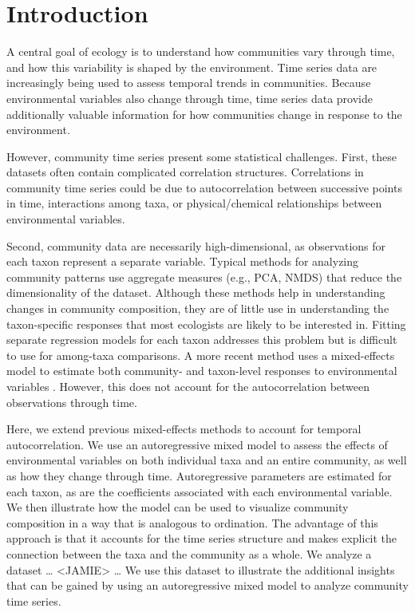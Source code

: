 

\section*{Introduction}


A central goal of ecology is to understand how communities vary through time, and
how this variability is shaped by the environment.
Time series data are increasingly being used to assess temporal trends in communities.
Because environmental variables also change through time, time series data provide
additionally valuable information for how communities change in response to the
environment.


However, community time series present some statistical challenges.
First, these datasets often contain complicated correlation structures.
Correlations in community time series could be due to
autocorrelation between successive points in time,
interactions among taxa,
or physical/chemical relationships between environmental variables.


Second, community data are necessarily high-dimensional, as observations for each taxon
represent a separate variable.
Typical methods for analyzing community patterns use aggregate measures (e.g., PCA, NMDS)
that reduce the dimensionality of the dataset.
Although these methods help in understanding changes in community composition,
they are of little use in understanding the taxon-specific responses
that most ecologists are likely to be interested in.
Fitting separate regression models for each taxon addresses this problem but
is difficult to use for among-taxa comparisons.
A more recent method uses a mixed-effects model to estimate both
community- and taxon-level responses to environmental variables \citep{Jackson2012}.
However, this does not account for the autocorrelation between observations through time.


Here, we extend previous mixed-effects methods to account for temporal autocorrelation.
We use an autoregressive mixed model to assess the effects of environmental variables
on both individual taxa and an entire community, as well as how they change through time.
Autoregressive parameters are estimated for each taxon, as are the coefficients
associated with each environmental variable.
We then illustrate how the model can be used to visualize community composition in
a way that is analogous to ordination.
The advantage of this approach is that it accounts for the time series structure and
makes explicit the connection between the taxa and the community as a whole.
We analyze a dataset
\ldots
<JAMIE>
\ldots
We use this dataset to illustrate the additional insights that can be gained
by using an autoregressive mixed model to analyze community time series.







